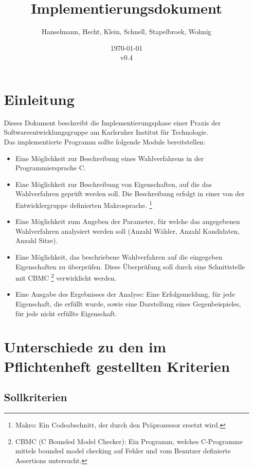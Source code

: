 \documentclass[a4paper]{scrreprt}
\begin{document}
\title{Implementierungsdokument}
\author{Hanselmann, Hecht, Klein, Schnell, Stapelbroek, Wohnig}
\date{\today\\v0.4}
\maketitle 
\tableofcontents	


\chapter{Einleitung}
Dieses Dokument beschreibt die Implementierungsphase einer Praxis der Softwareentwicklungsgruppe am Karlsruher Institut für Technologie. \\
Das implementierte Programm sollte folgende Module bereitstellen: 
\begin{itemize}
\item Eine Möglichkeit zur Beschreibung eines Wahlverfahrens in der Programmiersprache C. 
\item Eine Möglichkeit zur Beschreibung von Eigenschaften, auf die das Wahlverfahren geprüft werden soll. Die Beschreibung erfolgt in einer von der Entwicklergruppe definierten Makrosprache. \footnote{Makro: Ein Codeabschnitt, der durch den Präprozessor ersetzt wird.}
\item Eine Möglichkeit zum Angeben der Parameter, für welche das angegebenen Wahlverfahren analysiert werden soll (Anzahl Wähler, Anzahl Kandidaten, Anzahl Sitze). 
\item Eine Möglichkeit, das beschriebene Wahlverfahren auf die eingegeben Eigenschaften zu überprüfen. Diese Überprüfung soll durch eine Schnittstelle mit CBMC \footnote{CBMC (C Bounded Model Checker): Ein Programm, welches C-Programme mittels bounded model checking auf Fehler und vom Benutzer definierte Assertions untersucht. } verwirklicht werden.
\item Eine Ausgabe des Ergebnisses der Analyse: Eine Erfolgsmeldung, für jede Eigenschaft, die erfüllt wurde, sowie eine Darstellung eines Gegenbeispieles, für jede nicht erfüllte Eigenschaft. 
\end{itemize}


\chapter{Unterschiede zu den im Pflichtenheft gestellten Kriterien}

\section{Sollkriterien}
\end{document}
